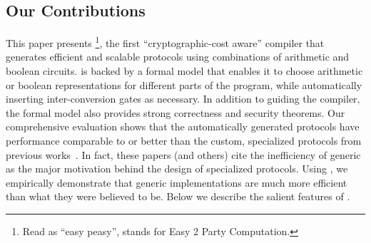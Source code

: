 
\subsection{Our Contributions}
This paper presents \tool\footnote{Read as ``easy peasy'',
stands for Easy 2 Party Computation.}, the first
``cryptographic-cost aware'' compiler that generates efficient and
scalable \mpc protocols using combinations of
arithmetic and boolean circuits. \tool is backed by a formal model
that enables it to choose arithmetic or boolean representations for
different parts of
the program, while automatically inserting inter-conversion gates as
necessary. In addition to guiding the compiler, the formal model also
provides strong correctness and
security theorems. Our comprehensive evaluation shows that the
automatically generated protocols have performance comparable to
or better than the custom, specialized
protocols from previous works~\cite{shafindss,wu,minionn,secureml,cryptonets,valeriaMatrix}.
In fact, these papers (and others) cite the inefficiency of generic \mpc as the major motivation
behind the design of specialized protocols. Using \tool, we empirically  demonstrate
that generic \mpc implementations are much more efficient than what they were believed to be. 
Below we describe
the salient features of \tool.



